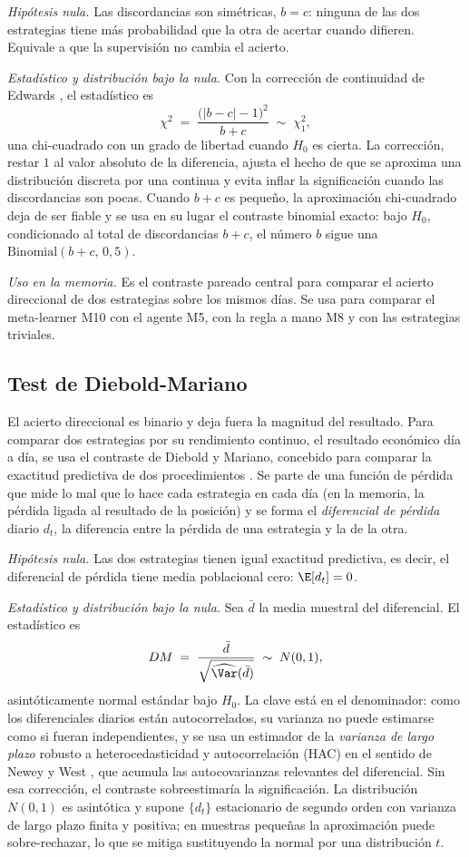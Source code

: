 \emph{Hipótesis nula.} Las discordancias son simétricas, $b = c$: ninguna de las dos estrategias tiene más probabilidad que la otra de acertar cuando difieren. Equivale a que la supervisión no cambia el acierto.

\emph{Estadístico y distribución bajo la nula.} Con la corrección de continuidad de Edwards \cite{edwards1948}, el estadístico es
\[
\chi^2 \;=\; \frac{\big(|b - c| - 1\big)^2}{b + c} \;\sim\; \chi^2_1,
\]
una chi-cuadrado con un grado de libertad cuando $H_0$ es cierta. La corrección, restar $1$ al valor absoluto de la diferencia, ajusta el hecho de que se aproxima una distribución discreta por una continua y evita inflar la significación cuando las discordancias son pocas. Cuando $b + c$ es pequeño, la aproximación chi-cuadrado deja de ser fiable y se usa en su lugar el contraste binomial exacto: bajo $H_0$, condicionado al total de discordancias $b+c$, el número $b$ sigue una $\mathrm{Binomial}(b+c,\, 0{,}5)$.

\emph{Uso en la memoria.} Es el contraste pareado central para comparar el acierto direccional de dos estrategias sobre los mismos días. Se usa para comparar el meta-learner M10 con el agente M5, con la regla a mano M8 y con las estrategias triviales.

\subsection{Test de Diebold-Mariano}
\label{sec:tests-dm}

El acierto direccional es binario y deja fuera la magnitud del resultado. Para comparar dos estrategias por su rendimiento continuo, el resultado económico día a día, se usa el contraste de Diebold y Mariano, concebido para comparar la exactitud predictiva de dos procedimientos \cite{diebold1995}. Se parte de una función de pérdida que mide lo mal que lo hace cada estrategia en cada día (en la memoria, la pérdida ligada al resultado de la posición) y se forma el \emph{diferencial de pérdida} diario $d_t$, la diferencia entre la pérdida de una estrategia y la de la otra.

\emph{Hipótesis nula.} Las dos estrategias tienen igual exactitud predictiva, es decir, el diferencial de pérdida tiene media poblacional cero: $\E[d_t] = 0$.

\emph{Estadístico y distribución bajo la nula.} Sea $\bar d$ la media muestral del diferencial. El estadístico es
\[
DM \;=\; \frac{\bar d}{\sqrt{\widehat{\Var}(\bar d)}} \;\sim\; N(0, 1),
\]
asintóticamente normal estándar bajo $H_0$. La clave está en el denominador: como los diferenciales diarios están autocorrelados, su varianza no puede estimarse como si fueran independientes, y se usa un estimador de la \emph{varianza de largo plazo} robusto a heterocedasticidad y autocorrelación (HAC) en el sentido de Newey y West \cite{newey1987}, que acumula las autocovarianzas relevantes del diferencial. Sin esa corrección, el contraste sobreestimaría la significación. La distribución $N(0,1)$ es asintótica y supone $\{d_t\}$ estacionario de segundo orden con varianza de largo plazo finita y positiva; en muestras pequeñas la aproximación puede sobre-rechazar, lo que se mitiga sustituyendo la normal por una distribución $t$.

